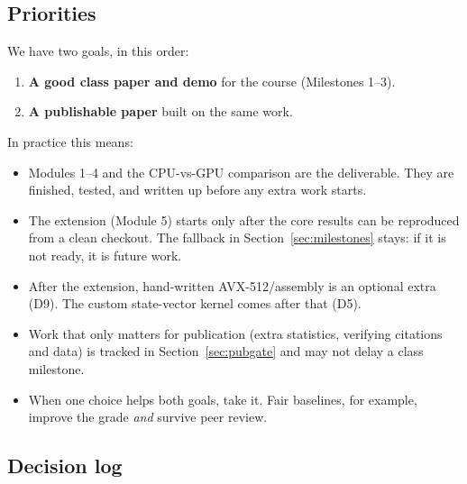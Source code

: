 \subsection{Priorities}
\label{sec:priorities}

We have two goals, in this order:
\begin{enumerate}[nosep]
  \item \textbf{A good class paper and demo} for the course (Milestones 1--3).
  \item \textbf{A publishable paper} built on the same work.
\end{enumerate}
In practice this means:
\begin{itemize}[nosep]
  \item Modules 1--4 and the CPU-vs-GPU comparison are the deliverable. They
        are finished, tested, and written up before any extra work starts.
  \item The extension (Module 5) starts only after the core results can be
        reproduced from a clean checkout. The fallback in
        Section~\ref{sec:milestones} stays: if it is not ready, it is future
        work.
  \item After the extension, hand-written AVX-512/assembly is an optional
        extra (D9). The custom state-vector kernel comes after that (D5).
  \item Work that only matters for publication (extra statistics, verifying
        citations and data) is tracked in Section~\ref{sec:pubgate} and may
        not delay a class milestone.
  \item When one choice helps both goals, take it. Fair baselines, for
        example, improve the grade \emph{and} survive peer review.
\end{itemize}

\subsection{Decision log}


